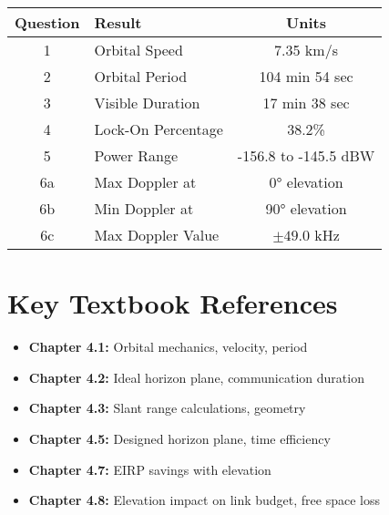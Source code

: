 \documentclass[11pt,letterpaper]{article}
\begin{document}
\begin{center}
\begin{tabular}{@{}clc@{}}
\toprule
\textbf{Question} & \textbf{Result} & \textbf{Units} \\
\midrule
1 & Orbital Speed & 7.35 km/s \\
2 & Orbital Period & 104 min 54 sec \\
3 & Visible Duration & 17 min 38 sec \\
4 & Lock-On Percentage & 38.2\% \\
5 & Power Range & -156.8 to -145.5 dBW \\
6a & Max Doppler at & 0° elevation \\
6b & Min Doppler at & 90° elevation \\
6c & Max Doppler Value & $\pm 49.0$ kHz \\
\bottomrule
\end{tabular}
\end{center}

\section{Key Textbook References}

\begin{itemize}
    \item \textbf{Chapter 4.1:} Orbital mechanics, velocity, period
    \item \textbf{Chapter 4.2:} Ideal horizon plane, communication duration
    \item \textbf{Chapter 4.3:} Slant range calculations, geometry
    \item \textbf{Chapter 4.5:} Designed horizon plane, time efficiency
    \item \textbf{Chapter 4.7:} EIRP savings with elevation
    \item \textbf{Chapter 4.8:} Elevation impact on link budget, free space loss
\end{itemize}
\end{document}
